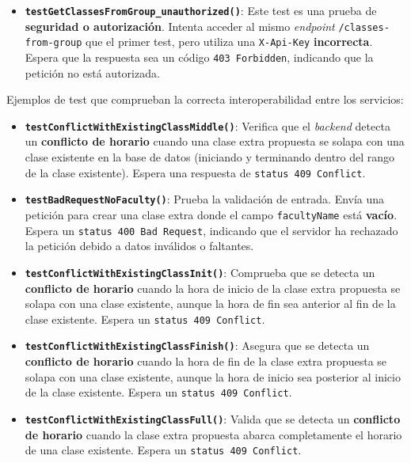\begin{itemize}
    \item \textbf{\texttt{testGetClassesFromGroup\_unauthorized()}}:
    Este test es una prueba de \textbf{seguridad o autorización}. Intenta acceder al mismo \textit{endpoint} \texttt{/classes-from-group} que el primer test, pero utiliza una \texttt{X-Api-Key} \textbf{incorrecta}. Espera que la respuesta sea un código \texttt{403 Forbidden}, indicando que la petición no está autorizada.
\end{itemize}

Ejemplos de test que comprueban la correcta interoperabilidad entre los servicios:

\begin{itemize}
    \item \textbf{\texttt{testConflictWithExistingClassMiddle()}}:
    Verifica que el \textit{backend} detecta un \textbf{conflicto de horario} cuando una clase extra propuesta se solapa con una clase existente en la base de datos (iniciando y terminando dentro del rango de la clase existente). Espera una respuesta de \texttt{status 409 Conflict}.

    \item \textbf{\texttt{testBadRequestNoFaculty()}}:
    Prueba la validación de entrada. Envía una petición para crear una clase extra donde el campo \texttt{facultyName} está \textbf{vacío}. Espera un \texttt{status 400 Bad Request}, indicando que el servidor ha rechazado la petición debido a datos inválidos o faltantes.

    \item \textbf{\texttt{testConflictWithExistingClassInit()}}:
    Comprueba que se detecta un \textbf{conflicto de horario} cuando la hora de inicio de la clase extra propuesta se solapa con una clase existente, aunque la hora de fin sea anterior al fin de la clase existente. Espera un \texttt{status 409 Conflict}.

    \item \textbf{\texttt{testConflictWithExistingClassFinish()}}:
    Asegura que se detecta un \textbf{conflicto de horario} cuando la hora de fin de la clase extra propuesta se solapa con una clase existente, aunque la hora de inicio sea posterior al inicio de la clase existente. Espera un \texttt{status 409 Conflict}.

    \item \textbf{\texttt{testConflictWithExistingClassFull()}}:
    Valida que se detecta un \textbf{conflicto de horario} cuando la clase extra propuesta abarca completamente el horario de una clase existente. Espera un \texttt{status 409 Conflict}.
\end{itemize}

